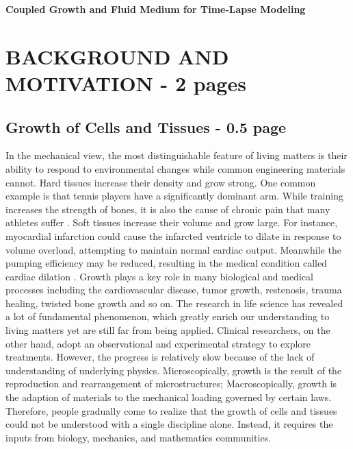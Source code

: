 \documentclass[12pt]{article}
\begin{document}
\begin{center}
 \LARGE\textbf{Coupled Growth and Fluid Medium for Time-Lapse Modeling}
\end{center}

\tableofcontents
\clearpage

\section{BACKGROUND AND MOTIVATION - 2 pages}

\subsection{Growth of Cells and Tissues - 0.5 page}
In the mechanical view, the most distinguishable feature of living matters is their ability to respond to environmental changes while common engineering materials cannot. Hard tissues increase their density and grow strong. One common example is that tennis players have a significantly dominant arm. While training increases the strength of bones, it is also the cause of chronic pain that many athletes suffer \cite{Kuhl6}. Soft tissues increase their volume and grow large. For instance, myocardial infarction could cause the infarcted ventricle to dilate in response to volume overload, attempting to maintain normal cardiac output. Meanwhile the pumping efficiency may be reduced, resulting in the medical condition called cardiac dilation \cite{Guccione}. Growth plays a key role in many biological and medical processes including the cardiovascular disease, tumor growth, restenosis, trauma healing, twisted bone growth and so on. The research in life science has revealed a lot of fundamental phenomenon, which greatly enrich our understanding to living matters yet are still far from being applied. Clinical researchers, on the other hand, adopt an observational and experimental strategy to explore treatments. However, the progress is relatively slow because of the lack of understanding of underlying physics. Microscopically, growth is the result of the reproduction and rearrangement of microstructures; Macroscopically, growth is the adaption of materials to the mechanical loading governed by certain laws. Therefore, people gradually come to realize that the growth of cells and tissues could not be understood with a single discipline alone. Instead, it requires the inputs from biology, mechanics, and mathematics communities.
\end{document}
